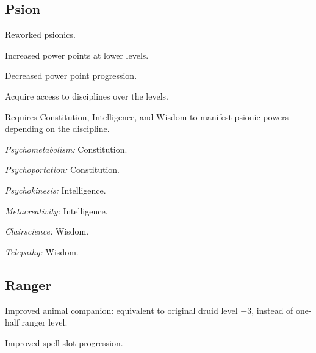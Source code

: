 \subsection{Psion}
\begin{itemize*}
\item Reworked psionics.
\item Increased power points at lower levels.
\item Decreased power point progression.
\item Acquire access to disciplines over the levels.
\item Requires Constitution, Intelligence, and Wisdom to manifest psionic powers depending on the discipline.
	\begin{itemize*}
	\item \textit{Psychometabolism:} Constitution.
	\item \textit{Psychoportation:} Constitution.
	\item \textit{Psychokinesis:} Intelligence.
	\item \textit{Metacreativity:} Intelligence.
	\item \textit{Clairscience:} Wisdom.
	\item \textit{Telepathy:} Wisdom.
	\end{itemize*}
\end{itemize*}


\subsection{Ranger}
\begin{itemize*}
\item Improved animal companion: equivalent to original druid level $-3$, instead of one-half ranger level.
\item Improved spell slot progression.
\end{itemize*}

